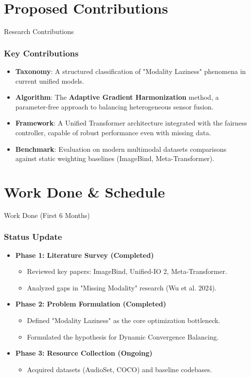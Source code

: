 \documentclass[serif, aspectratio=169]{beamer}
\begin{document}
\section{Proposed Contributions}
\begin{frame}{Research Contributions}
    \frametitle<presentation>{Key Contributions}
    \begin{itemize}
        \item \justifying \textbf{Taxonomy}: A structured classification of "Modality Laziness" phenomena in current unified models.
        \item \justifying \textbf{Algorithm}: The \textbf{Adaptive Gradient Harmonization} method, a parameter-free approach to balancing heterogeneous sensor fusion.
        \item \justifying \textbf{Framework}: A Unified Transformer architecture integrated with the fairness controller, capable of robust performance even with missing data.
        \item \justifying \textbf{Benchmark}: Evaluation on modern multimodal datasets comparisons against static weighting baselines (ImageBind, Meta-Transformer).
    \end{itemize}
\end{frame}

\section{Work Done \& Schedule}
\begin{frame}{Work Done (First 6 Months)}
    \frametitle<presentation>{Status Update}
    \begin{itemize}
        \item \textbf{Phase 1: Literature Survey (Completed)} 
        \begin{itemize}
            \item Reviewed key papers: ImageBind, Unified-IO 2, Meta-Transformer.
            \item Analyzed gaps in "Missing Modality" research (Wu et al. 2024).
        \end{itemize}
        \item \textbf{Phase 2: Problem Formulation (Completed)}
        \begin{itemize}
            \item Defined "Modality Laziness" as the core optimization bottleneck.
            \item Formulated the hypothesis for Dynamic Convergence Balancing.
        \end{itemize}
        \item \textbf{Phase 3: Resource Collection (Ongoing)}
        \begin{itemize}
             \item Acquired datasets (AudioSet, COCO) and baseline codebases.
        \end{itemize}
    \end{itemize}
\end{frame}
\end{document}
